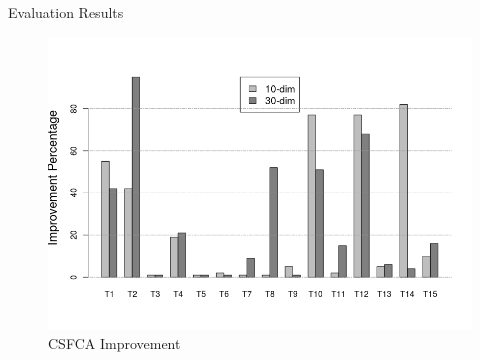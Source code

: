 \documentclass[table]{beamer}
\begin{document}
	
	\begin{frame}{Evaluation Results}
		\begin{figure}[v]
			\includegraphics[scale=0.43]{percent_C}
			\centering
			\caption{CSFCA Improvement}
			\label{ref:percent_c}
		\end{figure}
	\end{frame}
	
\end{document}
